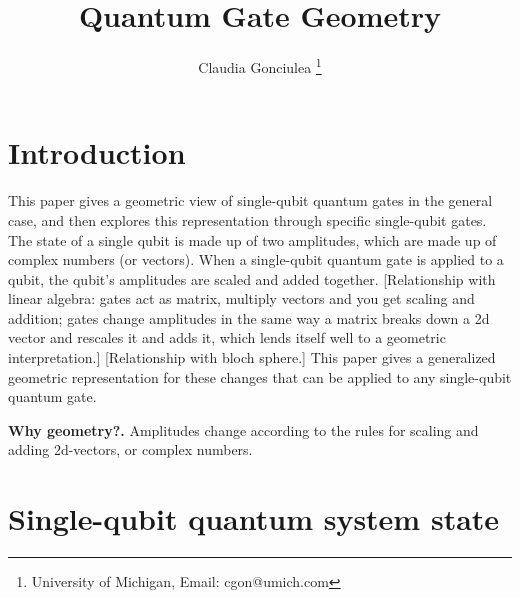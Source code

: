 \documentclass[11pt, letterpaper]{article}
\renewcommand{\myboldhead}[1]{\vspace{.1in}\hspace{-.14in}\textbf{#1.}}
\begin{document}
\title{\vspace{-1in} Quantum Gate Geometry}

\author{Claudia Gonciulea \footnote{University of Michigan, Email: cgon@umich.com}
\date{}
}




\maketitle

\begin{figure}[hb]
	\centering
	\def\xyz{1.0}
	\setlength\fboxsep{0pt}
	\label{fig:sigcoll}
\end{figure} 

\newpage

\section{Introduction}
This paper gives a geometric view of single-qubit quantum gates in the general case, and then explores this representation through specific single-qubit gates. The state of a single qubit is made up of two amplitudes, which are made up of complex numbers (or vectors). When a single-qubit quantum gate is applied to a qubit, the qubit’s amplitudes are scaled and added together. [Relationship with linear algebra: gates act as matrix, multiply vectors and you get scaling and addition; gates change amplitudes in the same way a matrix breaks down a 2d vector and rescales it and adds it, which lends itself well to a geometric interpretation.]  [Relationship with bloch sphere.] This paper gives a generalized geometric representation for these changes that can be applied to any single-qubit quantum gate.

\myboldhead{Why geometry?}
Amplitudes change according to the rules for scaling and adding 2d-vectors, or complex numbers.


\section{Single-qubit quantum system state}
\label{sec:state}
\end{document}
